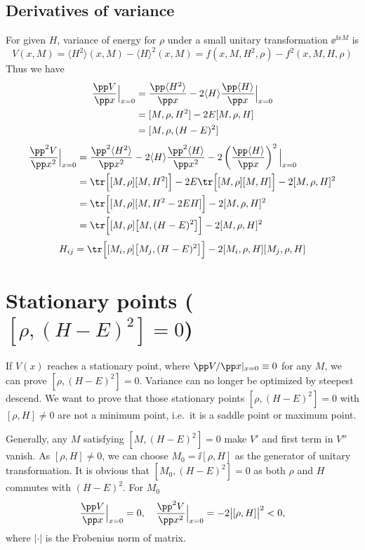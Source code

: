 \documentclass[10pt]{article}
\begin{document}
\subsection{Derivatives of variance}
For given $H$, variance of energy for $\rho$ under a small unitary transformation $\ee^{\ii xM}$ is 
\begin{equation}
V(x, M)=\langle H^2\rangle(x, M)-\langle H\rangle^2(x, M)=f(x, M, H^2, \rho)-f^2(x, M, H, \rho)
\end{equation}
Thus we have
\begin{align}
\frac{\pp V}{\pp x}\Big|_{x=0}&=\frac{\pp \langle H^2\rangle}{\pp x}-2\langle H\rangle\frac{\pp \langle H\rangle}{\pp x}\Big|_{x=0}\\
&=[M, \rho, H^2]-2E[M, \rho, H]\\
&= [M, \rho, (H-E)^2]
\end{align}
\begin{align}
\frac{\pp^2 V}{\pp x^2}\Big|_{x=0}&=\frac{\pp^2 \langle H^2\rangle}{\pp x^2}-2\langle H\rangle\frac{\pp^2 \langle H\rangle}{\pp x^2}-2\left(\frac{\pp \langle H\rangle}{\pp x}\right)^2\Big|_{x=0}\\
&=\tr \Big[[M,\rho][M, H^2]\Big]-2E\tr \Big[[M,\rho][M, H]\Big]-2[M, \rho, H]^2\\
&=\tr \Big[[M,\rho][M, H^2-2EH]\Big]-2[M, \rho, H]^2\\
&=\tr \Big[[M,\rho]\big[M, (H-E)^2\big]\Big]-2[M, \rho, H]^2
\end{align}
\begin{equation}
	H_{ij}=\tr \Big[[M_i,\rho]\big[M_j, (H-E)^2\big]\Big]-2[M_i, \rho, H][M_j, \rho, H]
\end{equation}
\section{Stationary points (\texorpdfstring{$[\rho, (H-E)^2]=0$}{[rho, (H-E)^2]=0})}
If $V(x)$ reaches a stationary point, where $\pp V/\pp x|_{x=0}\equiv 0$ for any $M$, we can prove $[\rho, (H-E)^2]=0$. Variance can no longer be optimized by steepest descend. We want to prove that those stationary points $[\rho, (H-E)^2]=0$ with $[\rho, H]\neq 0$ are not a minimum point, i.e.\ it is a saddle point or maximum point. 

Generally, any $M$ satisfying $[M, (H-E)^2]=0$ make $V'$ and first term in $V''$ vanish. As $[\rho, H]\neq 0$, we can choose $M_0=\ii[\rho, H]$ as the generator of unitary transformation. It is obvious that $[M_0, (H-E)^2]=0$ as both $\rho$ and $H$ commutes with $(H-E)^2$. For $M_0$
\begin{equation}
\frac{\pp V}{\pp x}\Big|_{x=0}=0,\quad \frac{\pp^2 V}{\pp x^2}\Big|_{x=0}=-2\big|[\rho, H]\big|^2<0,
\end{equation}
where $|\cdot|$ is the Frobenius norm of matrix. 
\end{document}
